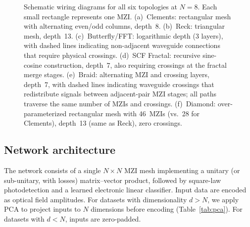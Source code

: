 \documentclass[11pt,a4paper]{article}
\begin{document}
\begin{figure}[t]
\caption{Schematic wiring diagrams for all six topologies at $N{=}8$.
Each small rectangle represents one MZI.  (a)~Clements: rectangular mesh with
alternating even/odd columns, depth~8.  (b)~Reck: triangular mesh, depth~13.
(c)~Butterfly/FFT: logarithmic depth (3 layers), with dashed lines indicating
non-adjacent waveguide connections that require physical crossings.
(d)~SCF Fractal: recursive sine-cosine construction, depth~7, also requiring
crossings at the fractal merge stages.
(e)~Braid: alternating MZI and crossing layers, depth~7, with dashed lines
indicating waveguide crossings that redistribute signals between adjacent-pair
MZI stages; all paths traverse the same number of MZIs and crossings.
(f)~Diamond: over-parameterized rectangular mesh with 46~MZIs (vs.\ 28 for
Clements), depth~13 (same as Reck), zero crossings.}
\label{fig:schematics}
\end{figure}


\subsection{Network architecture}
\label{sec:arch}

The network consists of a single $N \times N$ MZI mesh implementing a unitary
(or sub-unitary, with losses) matrix--vector product, followed by square-law
photodetection and a learned electronic linear classifier.  Input data are encoded
as optical field amplitudes.  For datasets with dimensionality $d > N$, we apply
PCA to project inputs to $N$ dimensions before encoding (Table~\ref{tab:pca}).
For datasets with $d < N$, inputs are zero-padded.
\end{document}
